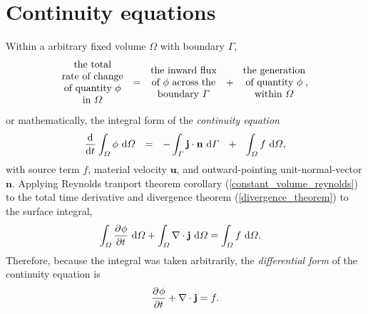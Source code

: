 \section{Continuity equations} \label{ssn_continuity_equations}

Within a arbitrary fixed volume $\Omega$ with boundary $\Gamma$, 
\begin{align*}
  \begin{matrix}
    \text{the total} \\
    \text{rate of change} \\
    \text{of quantity $\phi$} \\
    \text{in $\Omega$}
  \end{matrix} \hspace{2.5mm} = \hspace{2.5mm} 
  \begin{matrix}
    \text{the inward flux} \\
    \text{of $\phi$ across the} \\
    \text{boundary $\Gamma$} \\
  \end{matrix} \hspace{2.5mm} + \hspace{2.5mm} 
  \begin{matrix}
    \text{the generation} \\
    \text{of quantity $\phi$} \\
    \text{within $\Omega$}
  \end{matrix}, 
\end{align*}
or mathematically, the integral form of the \emph{continuity equation}
\begin{align}
  \label{integral_continuity_equation}
  \totder{}{t} \int_{\Omega} \phi \d{\Omega} \hspace{2.5mm} = \hspace{2.5mm} - \int_{\Gamma} \mathbf{j} \cdot \mathbf{n} \d{\Gamma} \hspace{2.5mm} + \hspace{2.5mm} \int_{\Omega} f \d{\Omega},
\end{align}
with source term $f$, material velocity $\mathbf{u}$, and outward-pointing unit-normal-vector $\mathbf{n}$.  Applying Reynolds tranport theorem corollary (\ref{constant_volume_reynolds}) to the total time derivative and divergence theorem (\ref{divergence_theorem})  to the surface integral,
\begin{align*}
  \int_{\Omega} \parder{\phi}{t} \d{\Omega} + \int_{\Omega} \nabla \cdot \mathbf{j} \d{\Omega} &= \int_{\Omega} f \d{\Omega}.
\end{align*}
Therefore, because the integral was taken arbitrarily, the \emph{differential form} of the continuity equation is
\begin{align}
  \label{differential_continuity_equation}
  \parder{\phi}{t} + \nabla \cdot \mathbf{j} = f.
\end{align}

